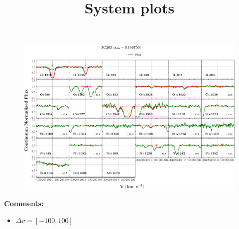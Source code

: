 \documentclass[12pt]{report}
\title{\textbf{System plots}}
\begin{document}
\maketitle




\begin{landscape}

    \begin{figure}
    \centering
    \vspace{-20mm}
    \hspace*{-35mm}
    \includegraphics[width=1.25\linewidth]{sys_plots_full/3C263_z=0.140756_sys_plot_full.png}
    \end{figure}
    
\end{landscape}

\textbf{Comments:}

\begin{itemize}
    \item $\Delta v = [-100,100]$
\end{itemize}
\end{document}
